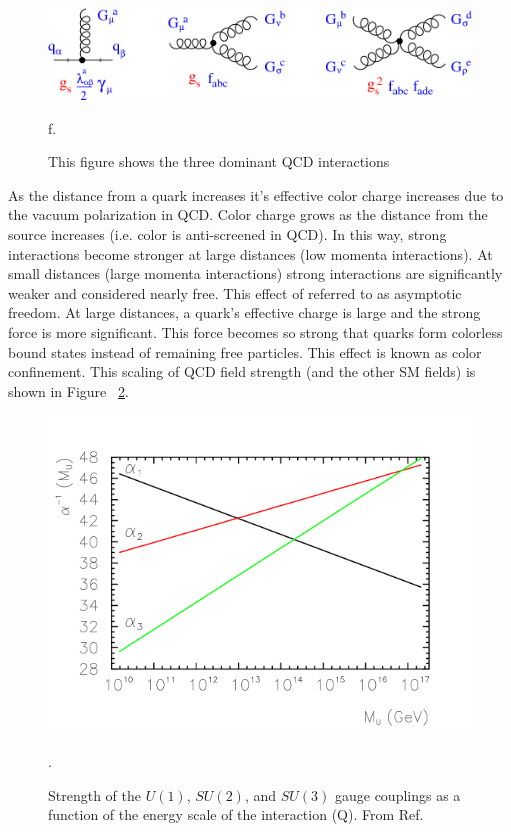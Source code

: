 \begin{figure}[h!]
  \centering
  \includegraphics[width=\hsize]{figures/Theory/QCD_vertices.png}
  \caption{This figure shows the three dominant QCD interactions \cite{pich}}f. 
  \label{fig:QCDinteractions}
\end{figure}
\FloatBarrier


As the distance from a quark increases it's effective color charge increases due to the vacuum polarization in QCD. Color charge grows as the distance from the source increases (i.e. color is anti-screened in QCD).  In this way, strong interactions become stronger at large distances (low momenta interactions).  At small distances (large momenta interactions) strong interactions are significantly weaker and considered nearly free. This effect of referred to as asymptotic freedom. At large distances, a quark's effective charge is large and the strong force is more significant. This force becomes so strong that quarks form colorless bound states instead of remaining free particles. This effect is known as color confinement. This scaling of QCD field strength (and the other SM fields) is shown in Figure ~\ref{fig:sm_couplings}. 

\begin{figure}[h!]
  \centering
  \includegraphics[width=\hsize]{figures/Theory/runningcouplings.png}
  \caption{Strength of the $U(1)$, $SU(2)$, and $SU(3)$ gauge couplings as a function of the energy scale of the interaction (Q). From Ref. \cite{runningcouplings}}. 
  \label{fig:sm_couplings}
\end{figure}
\FloatBarrier


